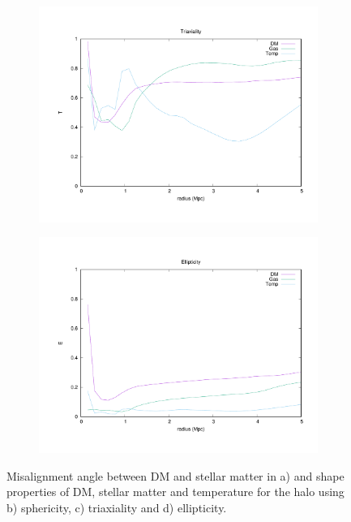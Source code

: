 \documentclass[journal]{IEEEtran}
\begin{document}
\begin{figure}[t!]
\begin{subfigure}[t]{0.45\textwidth}
		\includegraphics[width=\linewidth]{Triaxiality}
	\end{subfigure}
	\quad
	\begin{subfigure}[t]{0.45\textwidth}
		\centering
		\includegraphics[width=\linewidth]{Ellipticity}
	\end{subfigure}
\caption{Misalignment angle between DM and stellar matter in a) and shape properties of DM, stellar matter and temperature for the halo using b) sphericity, c) triaxiality and d) ellipticity.}
\label{fig:shapes}
\end{figure}
\end{document}
